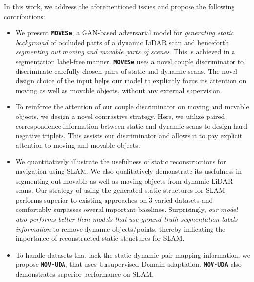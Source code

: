 \documentclass[10pt,twocolumn,letterpaper]{article}
\newcommand{\dslr}{\texttt{\textbf{MOVESe}}}
\newcommand{\dslruda}{\texttt{\textbf{MOV-UDA}}}
\begin{document}
In this work, we address the aforementioned issues and propose the following contributions:
\begin{itemize}

    \item We present \dslr{}, a GAN-based adversarial model for \textit{generating static background} of occluded parts of a dynamic LiDAR scan and henceforth \textit{segmenting out moving and movable  parts of scenes}. This is achieved in a segmentation label-free manner. \dslr{} uses a novel couple discriminator to discriminate carefully chosen pairs of static and dynamic scans. The novel design choice of the input helps our model to explicitly focus its attention on moving as well as movable objects, without any external supervision.
 
    \item To reinforce the attention of our couple discriminator on moving and movable objects, we design a novel contrastive strategy. Here, we utilize paired correspondence information between static and dynamic scans to design hard negative triplets. This assists our discriminator and allows it to pay explicit attention to moving and movable objects.

    \item We quantitatively illustrate the usefulness of static reconstructions for navigation using SLAM. We also qualitatively demonstrate its usefulness in segmenting out movable as well as moving objects from dynamic LiDAR scans. Our strategy of using the generated static structures for SLAM performs superior to existing approaches on $3$ varied datasets and comfortably surpasses several important baselines. Surprisingly, \textit{our model also performs better than models that use ground truth segmentation labels information} to remove dynamic objects/points, thereby indicating the importance of reconstructed static structures for SLAM.
    
   \item To handle datasets that lack the static-dynamic pair mapping information, we propose \dslruda{}, that uses Unsupervised Domain adaptation. \dslruda{} also demonstrates superior performance on SLAM.     
\end{itemize}
\end{document}
